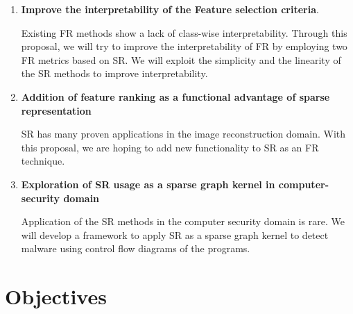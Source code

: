 \documentclass[11pt]{article}
\begin{document}
\begin{enumerate}
    \item \textbf{Improve the interpretability of the Feature selection criteria}.
    
    Existing FR methods show a lack of class-wise interpretability. Through this proposal, we will try to improve the interpretability of FR by employing two FR metrics based on SR. We will exploit the simplicity and the linearity of the SR methods to improve interpretability.
    
    \item \textbf{Addition of feature ranking as a functional advantage of sparse representation}
    
    SR has many proven applications in the image reconstruction domain. With this proposal, we are hoping to add new functionality to SR as an FR technique.  
    \item \textbf{Exploration of SR usage as a  sparse graph kernel in computer-security domain}
    
    Application of the SR methods in the computer security domain is rare. We will develop a framework to apply SR as a sparse graph kernel to detect malware using control flow diagrams of the programs.
\end{enumerate}


\section{Objectives}
\end{document}
